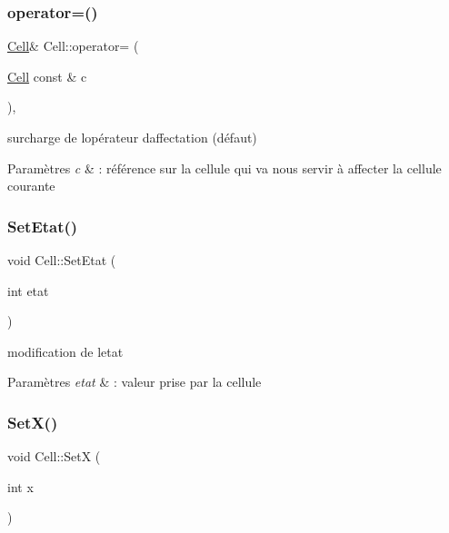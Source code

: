 \subsubsection{\texorpdfstring{operator=()}{operator=()}}
{\footnotesize\ttfamily \mbox{\hyperlink{class_cell}{Cell}}\& Cell\+::operator= (\begin{DoxyParamCaption}\item[{\mbox{\hyperlink{class_cell}{Cell}} const \&}]{c }\end{DoxyParamCaption})\hspace{0.3cm}{\ttfamily [private]}, {\ttfamily [default]}}



surcharge de l\textquotesingle{}opérateur d\textquotesingle{}affectation (défaut) 


\begin{DoxyParams}{Paramètres}
{\em c} & \+: référence sur la cellule qui va nous servir à affecter la cellule courante \\
\hline
\end{DoxyParams}
\mbox{\label{class_cell_a33dac87ec7294fdb4c67b8b430ea0946}} 
\subsubsection{\texorpdfstring{Set\+Etat()}{SetEtat()}}
{\footnotesize\ttfamily void Cell\+::\+Set\+Etat (\begin{DoxyParamCaption}\item[{int}]{etat }\end{DoxyParamCaption})}



modification de l\textquotesingle{}etat 


\begin{DoxyParams}{Paramètres}
{\em etat} & \+: valeur prise par la cellule \\
\hline
\end{DoxyParams}
\mbox{\label{class_cell_a9aaedcce2daccb4aa070f870c1a207ed}} 
\subsubsection{\texorpdfstring{Set\+X()}{SetX()}}
{\footnotesize\ttfamily void Cell\+::\+SetX (\begin{DoxyParamCaption}\item[{int}]{x }\end{DoxyParamCaption})\hspace{0.3cm}{\ttfamily [private]}}




